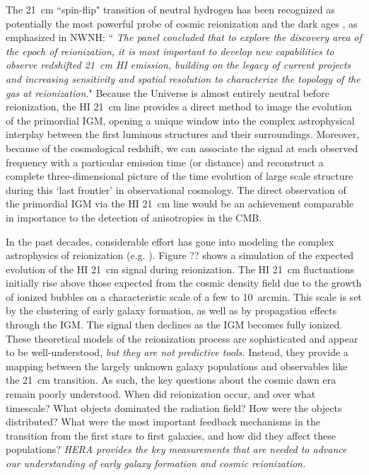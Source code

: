 \documentclass[preprint]{aastex}
\def\HI{{H{\small I }}}
\begin{document}
The 21~cm ``spin-flip" transition of  neutral hydrogen has been recognized as potentially the most powerful probe 
of cosmic reionization and  the dark ages \citep{morales_wyithe2010, furlanetto_et_al2006}, as emphasized in NWNH: 
``{\it 
The panel concluded that  to explore the discovery area of the epoch of reionization, it is most important to 
develop new capabilities to observe redshifted 21~cm \HI emission, building on the legacy of current projects and 
increasing sensitivity and spatial resolution to characterize the topology of the gas at reionization.}"  Because 
the Universe is almost entirely neutral before reionization, the HI 21~cm line provides a direct method to image 
the evolution of the primordial IGM, opening a unique window into the complex astrophysical interplay between the 
first luminous structures and their surroundings. Moreover, because of the cosmological redshift, we can associate 
the signal at each observed frequency with a particular emission time (or distance) and reconstruct a complete 
three-dimensional picture of the time evolution of large scale structure during this `last frontier' in 
observational cosmology. 
The direct observation of the primordial IGM via the HI 21~cm line would be an achievement comparable in importance 
to the detection of anisotropies in the CMB.

In the past decades, considerable effort has gone into modeling the complex astrophysics of reionization
(e.g. \citealt{shapiro_giroux1987, haiman_loeb1997, furlanetto_et_al2004, santos_et_al2010}). Figure ?? shows a 
simulation of the expected evolution of the HI 21~cm signal during reionization. The HI 21~cm fluctuations initially 
rise above those expected from the cosmic density field due to the growth of ionized bubbles on a characteristic 
scale of a few to 10~arcmin. This scale is set by the clustering of early galaxy formation, as well as by 
propagation effects through the IGM. The signal then declines as the IGM becomes fully ionized.  These theoretical 
models of the reionization process are sophisticated and appear to be well-understood, {\it but they are not 
predictive tools.} Instead, they provide a mapping between the largely unknown galaxy populations and observables 
like the 21~cm transition. As such, the key questions about the cosmic dawn era remain poorly understood.  When 
did reionization occur, and over what timescale?  What objects dominated the radiation field?  How were the 
objects distributed?  What were the most important feedback mechanisms in the transition from the first stars to
first galaxies, and how did they affect these populations?  {\it HERA provides the key measurements that are needed 
to advance our understanding of early galaxy formation and cosmic reionization.}
\end{document}

